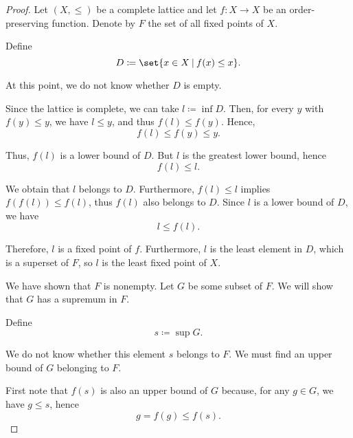 \begin{proof}
  Let \( (X, \leq) \) be a complete lattice and let \( f: X \to X \) be an order-preserving function. Denote by \( F \) the set of all fixed points of \( X \).

   Define
  \begin{equation*}
    D \coloneqq \set{ x \in X \given f(x) \leq x }.
  \end{equation*}

  At this point, we do not know whether \( D \) is empty.

  Since the lattice is complete, we can take \( l \coloneqq \inf D \). Then, for every \( y \) with \( f(y) \leq y \), we have \( l \leq y \), and thus \( f(l) \leq f(y) \). Hence,
  \begin{equation*}
    f(l) \leq f(y) \leq y.
  \end{equation*}

  Thus, \( f(l) \) is a lower bound of \( D \). But \( l \) is the greatest lower bound, hence
  \begin{equation*}
    f(l) \leq l.
  \end{equation*}

  We obtain that \( l \) belongs to \( D \). Furthermore, \( f(l) \leq l \) implies \( f(f(l)) \leq f(l) \), thus \( f(l) \) also belongs to \( D \). Since \( l \) is a lower bound of \( D \), we have
  \begin{equation*}
    l \leq f(l).
  \end{equation*}

  Therefore, \( l \) is a fixed point of \( f \). Furthermore, \( l \) is the least element in \( D \), which is a superset of \( F \), so \( l \) is the least fixed point of \( X \).

   We have shown that \( F \) is nonempty. Let \( G \) be some subset of \( F \). We will show that \( G \) has a supremum in \( F \).

  Define
  \begin{equation*}
    s \coloneqq \sup G.
  \end{equation*}

  We do not know whether this element \( s \) belongs to \( F \). We must find an upper bound of \( G \) belonging to \( F \).

  First note that \( f(s) \) is also an upper bound of \( G \) because, for any \( g \in G \), we have \( g \leq s \), hence
  \begin{equation*}
    g = f(g) \leq f(s).
  \end{equation*}


\end{proof}
